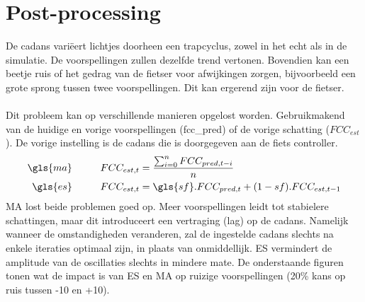 \section{Post-processing}
De cadans variëert lichtjes doorheen een trapcyclus, zowel in het echt als in de simulatie. De voorspellingen zullen dezelfde trend vertonen. Bovendien kan een beetje ruis of het gedrag van de fietser voor afwijkingen zorgen, bijvoorbeeld een grote sprong tussen twee voorspellingen. Dit kan ergerend zijn voor de fietser.
\\\\
Dit probleem kan op verschillende manieren opgelost worden. Gebruikmakend van de huidige en vorige voorspellingen (\gls{fcc_pred}) of de vorige schatting ($FCC_{est}$). De vorige instelling is de cadans die is doorgegeven aan de fiets controller.
\begin{align*}
\gls{ma} \tab  FCC_{est,t} &= \frac{\sum_{i=0}^{n} FCC_{pred,t-i} }{n}\\
\gls{es} \tab FCC_{est,t} &= \gls{sf} . FCC_{pred,t} + (1-sf) . FCC_{est,t-1}
\end{align*}
MA lost beide problemen goed op. Meer voorspellingen leidt tot stabielere schattingen, maar dit introduceert een vertraging (lag) op de cadans. Namelijk wanneer de omstandigheden veranderen, zal de ingestelde cadans slechts na enkele iteraties optimaal zijn, in plaats van onmiddellijk. ES vermindert de amplitude van de oscillaties slechts in mindere mate. De onderstaande figuren tonen wat de impact is van ES en MA op ruizige voorspellingen (20\% kans op ruis tussen -10 en +10).
